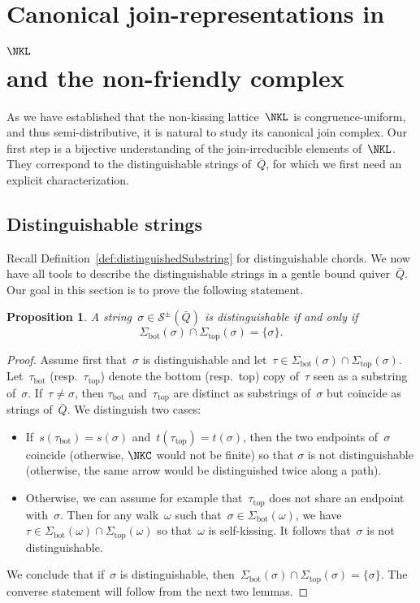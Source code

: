 \documentclass{memo-l}
\newtheorem{proposition}[theorem]{Proposition}
\theoremstyle{definition}
\newcommand{\strings}{\mathcal{S}} %
\renewcommand{\top}{\mathrm{top}} %
\newcommand{\bottom}{\mathrm{bot}} %
\begin{document}
\section[Canonical join-representations and non-friendly complex]{Canonical join-representations in~$\NKL$ \\ and the non-friendly complex}
\label{sec:nonFriendlyComplex}

As we have established that the non-kissing lattice~$\NKL$ is congruence-uniform, and thus semi-distributive, it is natural to study its canonical join complex.
Our first step is a bijective understanding of the join-irreducible elements of~$\NKL$.
They correspond to the distinguishable strings of~$\bar Q$, for which we first need an explicit characterization.

\subsection{Distinguishable strings}
\label{subsec:distinguishableStrings}

Recall Definition~\ref{def:distinguishedSubstring} for distinguishable chords.
We now have all tools to describe the distinguishable strings in a gentle bound quiver~$\bar Q$.
Our goal in this section is to prove the following statement.

\begin{proposition}
\label{prop:characterizationDistinguishableStrings}
A string~$\sigma \in \strings^\pm(\bar Q)$ is distinguishable if and only if
\[
\Sigma_\bottom(\sigma) \cap \Sigma_\top(\sigma) = \{\sigma\}.
\]
\end{proposition}

\begin{proof}
Assume first that~$\sigma$ is distinguishable and let~$\tau \in \Sigma_\bottom(\sigma) \cap \Sigma_\top(\sigma)$.
Let~$\tau_\bottom$ (resp.~$\tau_\top$) denote the bottom (resp.~top) copy of~$\tau$ seen as a substring of~$\sigma$.
If~$\tau \ne \sigma$, then $\tau_\bottom$ and~$\tau_\top$ are distinct as substrings of~$\sigma$ but coincide as strings of~$\bar Q$.
We distinguish two cases:
\begin{itemize}
\item If~$s(\tau_\bottom) = s(\sigma)$ and~$t(\tau_\top) = t(\sigma)$, then the two endpoints of~$\sigma$ coincide (otherwise, $\NKC$ would not be finite) so that $\sigma$ is not distinguishable (otherwise, the same arrow would be distinguished twice along a path).
\item Otherwise, we can assume for example that~$\tau_\top$ does not share an endpoint with~$\sigma$. Then for any walk~$\omega$ such that~$\sigma \in \Sigma_\bottom(\omega)$, we have ${\tau \in \Sigma_\bottom(\omega) \cap \Sigma_\top(\omega)}$ so that~$\omega$ is self-kissing. It follows that~$\sigma$ is not distinguishable.
\end{itemize}
We conclude that if~$\sigma$ is distinguishable, then~$\Sigma_\bottom(\sigma) \cap \Sigma_\top(\sigma) = \{\sigma\}$.
%
The converse statement will follow from the next two lemmas.
\end{proof}
\end{document}
